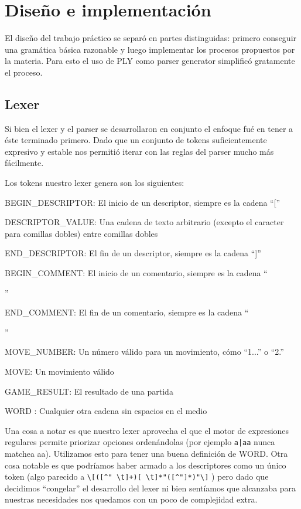 \section{Diseño e implementación}

El diseño del trabajo práctico se separó en partes distinguidas: primero conseguir una gramática básica razonable y luego implementar los procesos propuestos por la materia. Para esto el uso de PLY como parser generator simplificó gratamente el proceso.

\subsection{Lexer}

Si bien el lexer y el parser se desarrollaron en conjunto el enfoque fué en tener a éste terminado primero. Dado que un conjunto de tokens suficientemente expresivo y estable nos permitió iterar con las reglas del parser mucho más fácilmente.

Los tokens nuestro lexer genera son los siguientes:
\begin{itemize}
    \item BEGIN\_DESCRIPTOR: El inicio de un descriptor, siempre es la cadena ``[''
    \item DESCRIPTOR\_VALUE: Una cadena de texto arbitrario (excepto el caracter para comillas dobles) entre comillas dobles
    \item END\_DESCRIPTOR: El fin de un descriptor, siempre es la cadena ``]''
    \item BEGIN\_COMMENT: El inicio de un comentario, siempre es la cadena ``{''
    \item END\_COMMENT: El fin de un comentario, siempre es la cadena ``}''
    \item MOVE\_NUMBER: Un número válido para un movimiento, cómo ``1...'' o ``2.''
    \item MOVE: Un movimiento válido
    \item GAME\_RESULT: El resultado de una partida
    \item WORD : Cualquier otra cadena sin espacios en el medio
\end{itemize}
    
    
Una cosa a notar es que nuestro lexer aprovecha el que el motor de expresiones regulares permite priorizar opciones ordenándolas (por ejemplo \verb/a|aa/ nunca matchea aa). Utilizamos esto para tener una buena definición de WORD. Otra cosa notable es que podríamos haber armado a los descriptores como un único token (algo parecido a \verb/\[([^" \t]+)[ \t]*"([^"]*)"\]/ )  pero dado que decidimos ``congelar'' el desarrollo del lexer ni bien sentíamos que alcanzaba para nuestras necesidades nos quedamos con un poco de complejidad extra.

